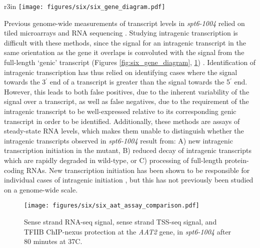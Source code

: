 \begin{wrapfigure}[7]{r}{3in}
    \centering
    \texttt{[image: figures/six/six\_gene\_diagram.pdf]}
    \caption[Diagram of transcript classes.]{Diagram of transcript orientation with respect to coding DNA sequences, for the categories of transcripts referred to in this document.}
    \label{fig:six_gene_diagram}
\end{wrapfigure}
Previous genome-wide measurements of transcript levels in \textit{spt6-1004} relied on tiled microarrays \citep{cheung2008} and RNA sequencing \citep{degennaro2013, uwimana2017}.
Studying intragenic transcription is difficult with these methods, since the signal for an intragenic transcript in the same orientation as the gene it overlaps is convoluted with the signal from the full-length `genic' transcript (Figures \ref{fig:six_gene_diagram}, \ref{fig:six_aat_assay_comparison}) \citep{cheung2008, lickwar2009}.
Identification of intragenic transcription has thus relied on identifying cases where the signal towards the 3$^\prime$ end of a transcript is greater than the signal towards the 5$^\prime$ end.
However, this leads to both false positives, due to the inherent variability of the signal over a transcript, as well as false negatives, due to the requirement of the intragenic transcript to be well-expressed relative to its corresponding genic transcript in order to be identified.
Additionally, these methods are assays of steady-state RNA levels, which makes them unable to distinguish whether the intragenic transcripts observed in \textit{spt6-1004} result from: A) new intragenic transcription initiation in the mutant, B) reduced decay of intragenic transcripts which are rapidly degraded in wild-type, or C) processing of full-length protein-coding RNAs.
New transcription initiation has been shown to be responsible for individual cases of intragenic initiation \citep{kaplan2003}, but this has not previously been studied on a genome-wide scale.
\begin{figure}[h]
    \centering
    \texttt{[image: figures/six/six\_aat\_assay\_comparison.pdf]}
    \caption[RNA-seq, TSS-seq, and TFIIB ChIP-nexus signal at the \textit{AAT2} gene, in \textit{spt6-1004} after 80 minutes at 37\textdegree C.]{Sense strand RNA-seq signal, sense strand TSS-seq signal, and TFIIB ChIP-nexus protection at the \textit{AAT2} gene, in \textit{spt6-1004} after 80 minutes at 37\textdegree C.}
    \label{fig:six_aat_assay_comparison}
\end{figure}


